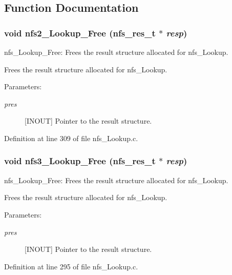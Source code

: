 \subsection{Function Documentation}
\subsubsection{\setlength{\rightskip}{0pt plus 5cm}void nfs2\_\-Lookup\_\-Free (nfs\_\-res\_\-t $\ast$ {\em resp})}\label{nfs__Lookup_8c_a2}


nfs\_\-Lookup\_\-Free: Frees the result structure allocated for nfs\_\-Lookup.

Frees the result structure allocated for nfs\_\-Lookup.

\begin{Desc}
\item[Parameters:]
\begin{description}
\item[{\em pres}][INOUT] Pointer to the result structure. \end{description}
\end{Desc}


Definition at line 309 of file nfs\_\-Lookup.c.
\subsubsection{\setlength{\rightskip}{0pt plus 5cm}void nfs3\_\-Lookup\_\-Free (nfs\_\-res\_\-t $\ast$ {\em resp})}\label{nfs__Lookup_8c_a1}


nfs\_\-Lookup\_\-Free: Frees the result structure allocated for nfs\_\-Lookup.

Frees the result structure allocated for nfs\_\-Lookup.

\begin{Desc}
\item[Parameters:]
\begin{description}
\item[{\em pres}][INOUT] Pointer to the result structure. \end{description}
\end{Desc}


Definition at line 295 of file nfs\_\-Lookup.c.
